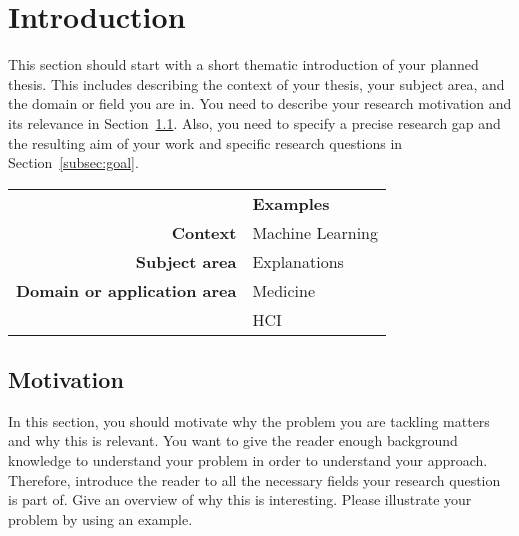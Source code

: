 \section{Introduction}
\label{sec:introduction}
This section should start with a short thematic introduction of your planned thesis. This includes describing the context of your thesis, your subject area, and the domain or field you are in. You need to describe your research motivation and its relevance in Section~\ref{subsec:motivation}. Also, you need to specify a precise research gap and the resulting aim of your work and specific research questions in Section~\ref{subsec:goal}.

\begin{table}[h]
\small
\colorbox{usethiscolorhere}{
\centering
\begin{tabularx}{\textwidth}{@{} r Y @{}}
	&
	\textbf{Examples}\vspace{2mm}\\
    \textbf{Context} & Machine Learning \vspace{2mm}\\
	\textbf{Subject area} &	Explanations \vspace{2mm}\\
    \textbf{Domain or application area} & Medicine \vspace{2mm}\\
     & HCI \vspace{2mm}\\
\end{tabularx}
}
\end{table}

\subsection{Motivation}
\label{subsec:motivation}
In this section, you should motivate why the problem you are tackling matters and why this is relevant. You want to give the reader enough background knowledge to understand your problem in order to understand your approach. Therefore, introduce the reader to all the necessary fields your research question is part of. Give an overview of why this is interesting. Please illustrate your problem by using an example.


